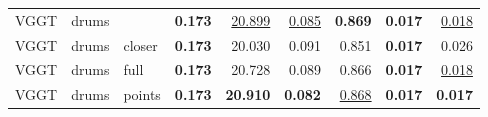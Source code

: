 \begin{table}[H]
\begin{tabular}{lllrrrrrr}
\midrule
VGGT & drums &  & \textbf{0.173} & \underline{20.899} & \underline{0.085} & \textbf{0.869} & \textbf{0.017} & \underline{0.018} \\
VGGT & drums & closer & \textbf{0.173} & 20.030 & 0.091 & 0.851 & \textbf{0.017} & 0.026 \\
VGGT & drums & full & \textbf{0.173} & 20.728 & 0.089 & 0.866 & \textbf{0.017} & \underline{0.018} \\
VGGT & drums & points & \textbf{0.173} & \textbf{20.910} & \textbf{0.082} & \underline{0.868} & \textbf{0.017} & \textbf{0.017} \\
\bottomrule
\end{tabular}
\end{table}